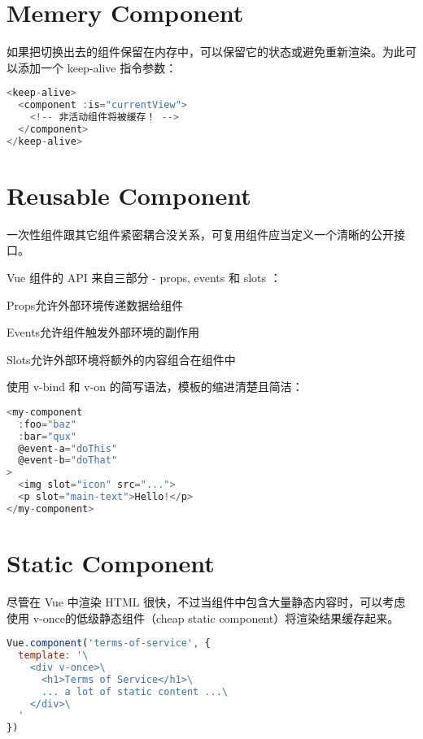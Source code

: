 \section{Memery Component}


如果把切换出去的组件保留在内存中，可以保留它的状态或避免重新渲染。为此可以添加一个 keep-alive 指令参数：

\begin{lstlisting}[language=JavaScript]
<keep-alive>
  <component :is="currentView">
    <!-- 非活动组件将被缓存！ -->
  </component>
</keep-alive>
\end{lstlisting}


\section{Reusable Component}

一次性组件跟其它组件紧密耦合没关系，可复用组件应当定义一个清晰的公开接口。

Vue 组件的 API 来自三部分 - props, events 和 slots ：

\begin{compactitem}
\item Props允许外部环境传递数据给组件
\item Events允许组件触发外部环境的副作用
\item Slots允许外部环境将额外的内容组合在组件中
\end{compactitem}

使用 v-bind 和 v-on 的简写语法，模板的缩进清楚且简洁：


\begin{lstlisting}[language=JavaScript]
<my-component
  :foo="baz"
  :bar="qux"
  @event-a="doThis"
  @event-b="doThat"
>
  <img slot="icon" src="...">
  <p slot="main-text">Hello!</p>
</my-component>
\end{lstlisting}

\section{Static Component}


尽管在 Vue 中渲染 HTML 很快，不过当组件中包含大量静态内容时，可以考虑使用 v-once的低级静态组件（cheap static component）将渲染结果缓存起来。



\begin{lstlisting}[language=JavaScript]
Vue.component('terms-of-service', {
  template: '\
    <div v-once>\
      <h1>Terms of Service</h1>\
      ... a lot of static content ...\
    </div>\
  '
})
\end{lstlisting}



